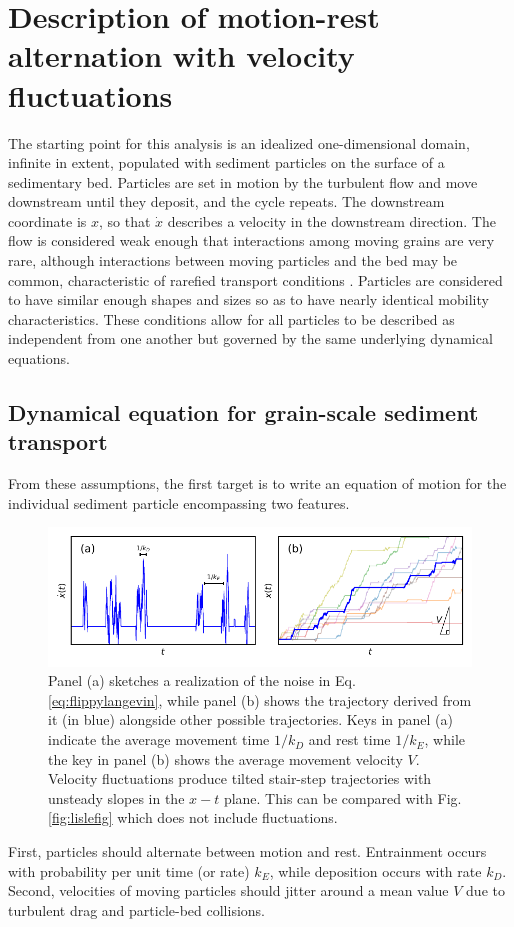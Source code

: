 \section{Description of motion-rest alternation with velocity fluctuations \label{sec:mod}}
The starting point for this analysis is an idealized one-dimensional domain, infinite in extent, populated with sediment particles on the surface of a sedimentary bed.
Particles are set in motion by the turbulent flow and move downstream until they deposit, and the cycle repeats.
The downstream coordinate is $x$, so that $\dot{x}$ describes a velocity in the downstream direction.
The flow is considered weak enough that interactions among moving grains are very rare, although interactions between moving particles and the bed may be common, characteristic of rarefied transport conditions \citep[e.g.][]{Kumaran2006,Furbish2017}. 
Particles are considered to have similar enough shapes and sizes so as to have nearly identical mobility characteristics.
These conditions allow for all particles to be described as independent from one another but governed by the same underlying dynamical equations.

\subsection{Dynamical equation for grain-scale sediment transport}
From these assumptions, the first target is to write an equation of motion for the individual sediment particle encompassing two features.
\begin{figure}
	\centerline{\includegraphics{./figures/ch2/fig0mod.pdf}}
	\caption{Panel (a) sketches a realization of the noise in Eq. \ref{eq:flippylangevin}, while panel (b) shows the trajectory derived from it (in blue) alongside other possible trajectories. Keys in panel (a) indicate the average movement time $1/k_D$ and rest time $1/k_E$, while the key in panel (b) shows the average movement velocity $V$. Velocity fluctuations produce tilted stair-step trajectories with unsteady slopes in the $x-t$ plane. This can be compared with Fig. \ref{fig:lislefig} which does not include fluctuations.}
	\label{fig:fluxxy0}
\end{figure}
First, particles should alternate between motion and rest.
Entrainment occurs with probability per unit time (or rate) $k_E$, while deposition occurs with rate $k_D$.
Second, velocities of moving particles should jitter around a mean value $V$ due to turbulent drag and particle-bed collisions.

